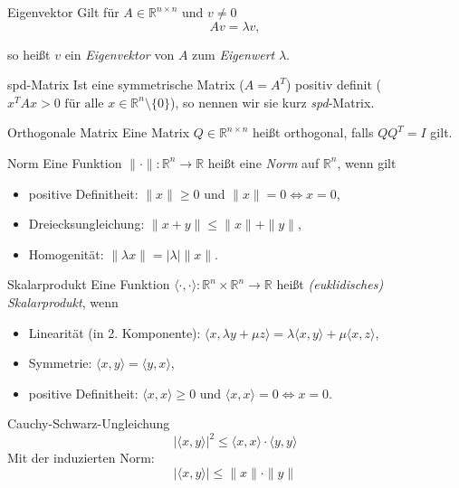 
\begin{flashcard}[Definition]{Eigenvektor}
Gilt für $A \in \mathbb{R}^{n \times n}$ und $v \neq 0$
$$
	A v = \lambda v,
$$

so heißt $v$ ein \emph{Eigenvektor} von $A$ zum \emph{Eigenwert} $\lambda$. 
\end{flashcard}

\begin{flashcard}[Definition]{spd-Matrix}
	Ist eine symmetrische Matrix ($A = A^T$) positiv definit ($x^T A x > 0 \text{ für alle } x \in \mathbb{R}^n\setminus\{0\}$), so nennen wir sie kurz \emph{spd}-Matrix.
\end{flashcard}

\begin{flashcard}[Definition]{Orthogonale Matrix}
	Eine Matrix $Q \in \mathbb{R}^{n \times n}$ heißt orthogonal, falls $QQ^T = I$ gilt.
\end{flashcard}

\begin{flashcard}[Definition]{Norm}
	Eine Funktion $\|\cdot\| : \mathbb{R}^n \rightarrow \mathbb{R}$ heißt eine \emph{Norm} auf $\mathbb{R}^n$, wenn gilt
	\begin{itemize}
		\item positive Definitheit: $\|x\| \geq 0$ und $\|x\| = 0 \Leftrightarrow x = 0$,
		\item Dreiecksungleichung: $ \| x + y \| \leq \|x\| + \|y\|$,
		\item Homogenität: $\|\lambda x\| = |\lambda|\|x\|$.
	\end{itemize}
\end{flashcard}

\begin{flashcard}[Definition]{Skalarprodukt}
	Eine Funktion $\langle \cdot, \cdot \rangle : \mathbb{R}^n \times \mathbb{R}^n \rightarrow \mathbb{R}$ heißt \emph{(euklidisches) Skalarprodukt}, wenn
	\begin{itemize}
		\item Linearität (in 2. Komponente): $\langle x, \lambda y + \mu z \rangle = \lambda \langle x, y \rangle + \mu \langle x, z \rangle$,
		\item Symmetrie: $\langle x, y\rangle = \langle y, x \rangle$,
		\item positive Definitheit: $\langle x, x \rangle \geq 0$ und $\langle x, x \rangle = 0 \Leftrightarrow x = 0$.
	\end{itemize}
\end{flashcard}

\begin{flashcard}[Satz]{Cauchy-Schwarz-Ungleichung}
	$$|\langle x, y \rangle|^2 \leq \langle x, x \rangle \cdot \langle y, y \rangle$$
	Mit der induzierten Norm:
	$$ |\langle x, y \rangle| \leq \|x\| \cdot \|y\| $$
\end{flashcard}
